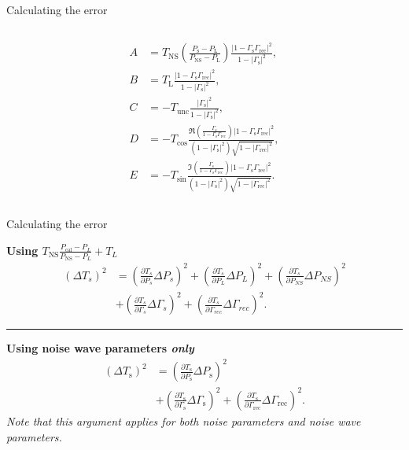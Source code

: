 \documentclass[aspectratio=169]{beamer}
\begin{document}
\begin{frame}{Calculating the error}
\begin{columns}[c]
		\begin{column}{0.6\textwidth}
			{\tiny
				\begin{align}
					A & = T_\mathrm{NS}\left(\frac{P_\mathrm{s} - P_\mathrm{L}}{P_\mathrm{NS}-P_\mathrm{L}}\right)\frac{\left|1-\Gamma_\mathrm{s}\Gamma_\mathrm{rec}\right|^2}{ 1-|\Gamma_\mathrm{s}|^2},                                               \\
					B & = T_\mathrm{L}\frac{\left|1-\Gamma_\mathrm{s}\Gamma_\mathrm{rec}\right|^2}{ 1-|\Gamma_\mathrm{s}|^2},                                                                                                                           \\
					C & = - T_\mathrm{unc} \frac{ |\Gamma_\mathrm{s}|^2}{1-\left|\Gamma_\mathrm{s}\right|^2},                                                                                                                                           \\
					D & = -T_\mathrm{cos} \frac{\Re \left( \frac{ \Gamma_\mathrm{s}}{1-\Gamma_\mathrm{s}\Gamma_\mathrm{rec}}\right)\left|1-\Gamma_\mathrm{s}\Gamma_\mathrm{rec}\right|^2}{( 1-|\Gamma_\mathrm{s}|^2) \sqrt{1-|\Gamma_\mathrm{rec}|^2}}, \\
					E & = -T_\mathrm{sin} \frac{\Im \left( \frac{ \Gamma_\mathrm{s}}{1-\Gamma_\mathrm{s}\Gamma_\mathrm{rec}}\right)\left|1-\Gamma_\mathrm{s}\Gamma_\mathrm{rec}\right|^2}{( 1-|\Gamma_\mathrm{s}|^2) \sqrt{1-|\Gamma_\mathrm{rec}|^2}}.
				\end{align}
			}
		\end{column}
	\end{columns}
\end{frame}

\begin{frame}{Calculating the error}

	\textbf{Using $T_{\text{NS}} \frac{P_{\text{cal}} - P_L}{P_{\text{NS}} - P_L} + T_L$}
	\begin{align}
		(\Delta T_s)^2 & = \left(\frac{\partial T_s}{\partial P_s} \Delta P_s\right)^2 + \left(\frac{\partial T_s}{\partial P_L} \Delta P_L\right)^2 + \left(\frac{\partial T_s}{\partial P_{NS}} \Delta P_{NS}\right)^2 \\ &+ \left(\frac{\partial T_s}{\partial \Gamma_s} \Delta \Gamma_s\right)^2 + \left(\frac{\partial T_s}{\partial \Gamma_{rec}} \Delta \Gamma_{rec}\right)^2.
	\end{align}

	\hrule
	\textbf{Using noise wave parameters \textit{only}}
	\begin{align}
		(\Delta T_\mathrm{s})^2 & = \left(\frac{\partial T_\mathrm{s}}{\partial P_\mathrm{s}} \Delta P_\mathrm{s}\right)^2 \\ &+ \left(\frac{\partial T_\mathrm{s}}{\partial \Gamma_\mathrm{s}} \Delta \Gamma_\mathrm{s}\right)^2 + \left(\frac{\partial T_\mathrm{s}}{\partial \Gamma_\mathrm{rec}} \Delta \Gamma_\mathrm{rec}\right)^2.
	\end{align}
	\textit{Note that this argument applies for both noise parameters and noise wave parameters.}

\end{frame}
\end{document}
